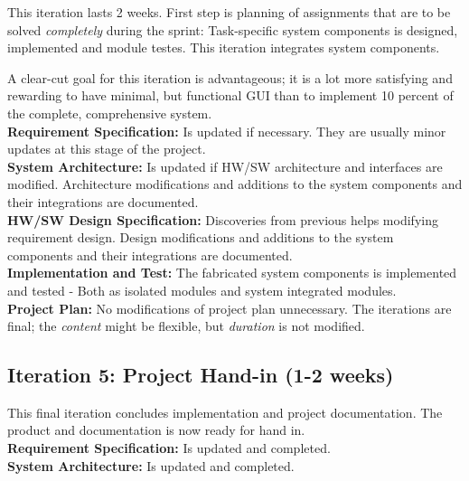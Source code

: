 This iteration lasts 2 weeks. First step is planning of assignments that are to be solved \textit{completely} during the sprint: Task-specific system components is designed, implemented and module testes. This iteration integrates system components. \newline

A clear-cut goal for this iteration is advantageous; it is a lot more satisfying and rewarding to have minimal, but functional GUI than to implement 10 percent of the complete, comprehensive system. \\

\textbf{Requirement Specification:} Is updated if necessary. They are usually minor updates at this stage of the project. \\

\textbf{System Architecture:} Is updated if HW/SW architecture and interfaces are modified. Architecture modifications and additions to the system components and their integrations are documented. \\

\textbf{HW/SW Design Specification:} Discoveries from previous helps modifying requirement design. Design modifications and additions to the system components and their integrations are documented. \\

\textbf{Implementation and Test:} The fabricated system components is implemented and tested - Both as isolated modules and system integrated modules. \\

\textbf{Project Plan:} No modifications of project plan unnecessary. The iterations are final; the \textit{content} might be flexible, but \textit{duration} is not modified. \newline

\subsection{Iteration 5: Project Hand-in (1-2 weeks)}
This final iteration concludes implementation and project documentation. The product and documentation is now ready for hand in. \\

\textbf{Requirement Specification:} Is updated and completed. \\

\textbf{System Architecture:} Is updated and completed. \\

